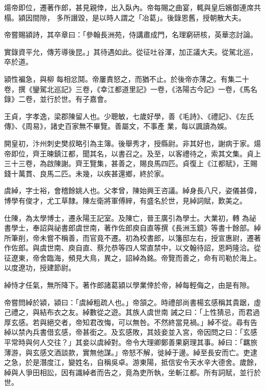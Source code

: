 \begin{pinyinscope}
 煬帝即位，遷著作郎，甚見親倖，出入臥內。帝每賜之曲宴，輒與皇后嬪御連席共榻。潁因間隙，
 多所譖毀，是以時人謂之「冶葛」。後錄恩舊，授朝散大夫。



 帝嘗賜潁詩，其卒章曰：「參翰長洲苑，侍講肅成門，名理窮研核，英華恣討論。



 實錄資平允，傳芳導後昆。」其待遇如此。從征吐谷渾，加正議大夫。從駕北巡，卒於道。


潁性褊急，與柳
 每相忿鬩。帝屢責怒之，而猶不止。於後帝亦薄之。有集二十卷，撰《鑾駕北巡記》三卷，《幸江都道里記》一卷，《洛陽古今記》一卷，《馬名錄》二卷，並行於世。有子嘉會。



 王貞，字孝逸，梁郡陳留人也。少聰敏，七歲好學，善《毛詩》、《禮記》、《左氏傳》、《周易》，諸史百家無不畢覽。善屬文，不事產
 業，每以諷讀為娛。



 開皇初，汴州刺史樊叔略引為主簿。後舉秀才，授縣尉。非其好也，謝病于家。煬帝即位，齊王暕鎮江都，聞其名，以書召之。及至，以客禮待之，索其文集。貞上三十三卷，為啟陳謝。齊王覽集，甚善之，賜良馬四匹。貞復上《江都賦》，王賜錢十萬貫、良馬二匹。未幾，以疾甚還鄉，終於家。



 虞綽，字士裕，會稽餘姚人也。父孝曾，陳始興王咨議。綽身長八尺，姿儀甚偉，博學有俊才，尤工草隸。陳左衛將軍傅縡，有盛名於世，見綽詞賦，歎美之。



 仕陳，為太學博士，遷永陽王記室。及陳亡，晉王廣引為學士。大業初，轉
 為祕書學士，奉詔與祕書郎虞世南，著作佐郎庾自直等撰《長洲玉鏡》等書十餘部。綽所筆削，帝未嘗不稱善，而官竟不遷。初為校書郎，以籓邸左右，授宣惠尉，遷著作佐郎。與虞世南、庾自直、蔡允恭等四人常直禁中，以文翰待詔，恩眄隆洽。從征遼東，帝舍臨海，頻見大鳥，異之，詔綽為銘。帝覽而善之，命有司勒於海上。以度遼功，授建節尉。



 綽恃才任氣，無所降下。著作郎諸葛潁以學業倖於帝，綽每輕侮之，由是有隙。



 帝嘗問綽於潁，潁曰：「虞綽粗疏人也。」帝頷之。時禮部尚書楊玄感稱其貴踞，虛己禮之，與結布衣之友。綽數從之遊。其族人虞世南
 誡之曰：「上性猜忌，而君過厚玄感。若與絕交者，帝知君改悔，可以無咎。不然終當見禍。」綽不從。尋有告綽以禁內兵書借玄感，帝甚銜之。及玄感敗，其妓妾並入宮，帝因問之曰：「玄感平常時與何人交往？」其妾以虞綽對。帝令大理卿鄭善果窮理其事。綽曰：「羈旅薄游，與玄感文酒談款，實無他謀。」帝怒不解，徙綽于邊。綽至長安而亡。吏逮之急，於是潛度江，變姓名，自稱吳卓。游東陽，抵信安令天水辛大德舍。歲餘，綽與人爭田相訟，因有識綽者而告之，竟為吏所執，坐斬江都。所有詞賦，並行於世。




\end{pinyinscope}
